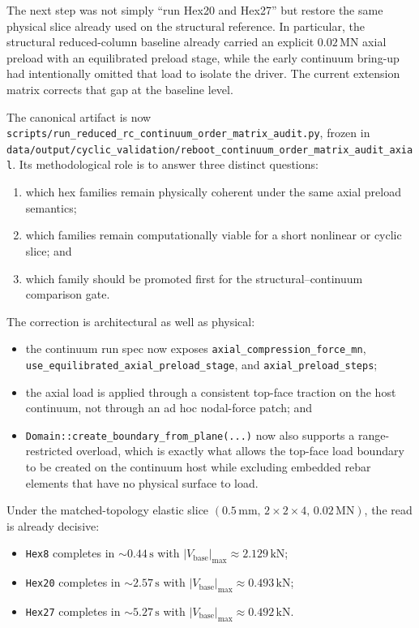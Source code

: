 The next step was not simply ``run Hex20 and Hex27'' but restore the same
physical slice already used on the structural reference. In particular, the
structural reduced-column baseline already carried an explicit
\(0.02\,\mathrm{MN}\) axial preload with an equilibrated preload stage, while
the early continuum bring-up had intentionally omitted that load to isolate the
driver. The current extension matrix corrects that gap at the baseline level.

The canonical artifact is now
\texttt{scripts/run\_reduced\_rc\_continuum\_order\_matrix\_audit.py}, frozen
in
\texttt{data/output/cyclic\_validation/reboot\_continuum\_order\_matrix\_audit\_axial}.
Its methodological role is to answer three distinct questions:
\begin{enumerate}
  \item which hex families remain physically coherent under the same axial
    preload semantics;
  \item which families remain computationally viable for a short nonlinear or
    cyclic slice; and
  \item which family should be promoted first for the structural--continuum
    comparison gate.
\end{enumerate}

The correction is architectural as well as physical:
\begin{itemize}
  \item the continuum run spec now exposes
    \texttt{axial\_compression\_force\_mn},
    \texttt{use\_equilibrated\_axial\_preload\_stage}, and
    \texttt{axial\_preload\_steps};
  \item the axial load is applied through a consistent top-face traction on the
    host continuum, not through an ad hoc nodal-force patch; and
  \item \texttt{Domain::create\_boundary\_from\_plane(...)} now also supports a
    range-restricted overload, which is exactly what allows the top-face load
    boundary to be created on the continuum host while excluding embedded rebar
    elements that have no physical surface to load.
\end{itemize}

Under the matched-topology elastic slice
\((0.5\,\mathrm{mm},\,2\times2\times4,\,0.02\,\mathrm{MN})\), the read is
already decisive:
\begin{itemize}
  \item \texttt{Hex8} completes in \(\sim 0.44\,\mathrm{s}\) with
    \(|V_{\mathrm{base}}|_{\max} \approx 2.129\,\mathrm{kN}\);
  \item \texttt{Hex20} completes in \(\sim 2.57\,\mathrm{s}\) with
    \(|V_{\mathrm{base}}|_{\max} \approx 0.493\,\mathrm{kN}\);
  \item \texttt{Hex27} completes in \(\sim 5.27\,\mathrm{s}\) with
    \(|V_{\mathrm{base}}|_{\max} \approx 0.492\,\mathrm{kN}\).
\end{itemize}

